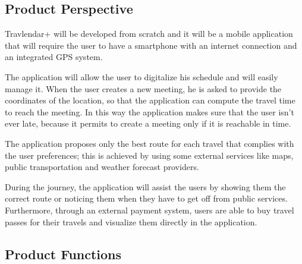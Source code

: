 \subsection{Product Perspective}
Travlendar+ will be developed from scratch and it will be a mobile application that will require the user to have a smartphone with an internet connection and an integrated GPS system.

The application will allow the user to digitalize his schedule and will easily manage it.
When the user creates a new meeting, he is asked to provide the coordinates of the location, so that the application can compute the travel time to reach the meeting.
In this way the application makes sure that the user isn't ever late, because it permits to create a meeting only if it is reachable in time.

The application proposes only the best route for each travel that complies with the user preferences; this is achieved by using some external services like maps, public transportation and weather forecast providers.

During the journey, the application will assist the users by showing them the correct route or noticing them when they have to get off from public services.
Furthermore, through an external payment system, users are able to buy travel passes for their travels and visualize them directly in the application.


\subsection{Product Functions}

